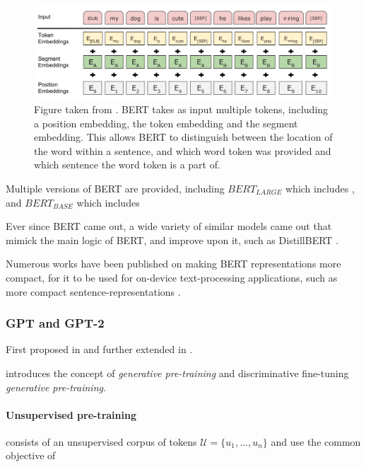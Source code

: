 \documentclass[a4paper,12pt,twoside,openright]{report}
\begin{document}
\begin{figure}[h]
	\center
  \includegraphics[width=\linewidth]{./assets/background/BERT_multiple_input_tokens.png}
  \caption{Figure taken from \cite{devlin18}. BERT takes as input multiple tokens, including a position embedding, the token embedding and the segment embedding. This allows BERT to distinguish between the location of the word within a sentence, and which word token was provided and which sentence the word token is a part of.}
  \label{fig:cbow_skipgram}
\end{figure}


Multiple versions of BERT are provided, including $BERT_{LARGE}$ which includes %
, and $BERT_{BASE}$ which includes %

Ever since BERT came out, a wide variety of similar models came out that mimick the main logic of BERT, and improve upon it, such as DistillBERT \cite{sanh19}.

Numerous works have been published on making BERT representations more compact, for it to be used for on-device text-processing applications, such as more compact sentence-representations \cite{shen19}.



\subsubsection{GPT and GPT-2}

First proposed in \cite{radford18} and further extended in \cite{radford19}.

\cite{radford18} introduces the concept of \textit{generative pre-training} and discriminative fine-tuning \textit{generative pre-training}.

\paragraph{Unsupervised pre-training} consists of an unsupervised corpus of tokens $\mathcal{U} = \{ u_1, \ldots, u_n \}$ and use the common objective of 
\end{document}
